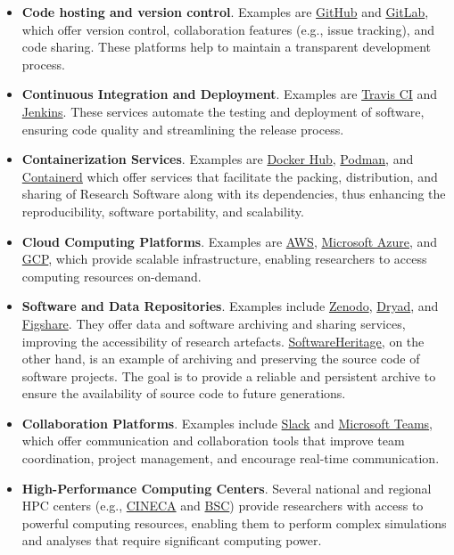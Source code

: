 \begin{itemize}
    \item \textbf{Code hosting and version control}. Examples are \href{https://github.com}{GitHub} and \href{https://about.gitlab.com/}{GitLab}, which offer version control, collaboration features (e.g., issue tracking), and code sharing. These platforms help to maintain a transparent development process.
    \item \textbf{Continuous Integration and Deployment}. Examples are \href{https://www.travis-ci.com/}{Travis CI} and \href{https://jenkins.io}{Jenkins}. These services automate the testing and deployment of software, ensuring code quality and streamlining the release process.
    \item \textbf{Containerization Services}. Examples are \href{https://hub.docker.com/}{Docker Hub}, \href{https://podman.io}{Podman}, and \href{https://containerd.io}{Containerd} which offer services that facilitate the packing, distribution, and sharing of Research Software along with its dependencies, thus enhancing the reproducibility, software portability, and scalability.
    \item \textbf{Cloud Computing Platforms}. Examples are \href{https://aws.amazon.com/}{AWS}, \href{https://azure.microsoft.com/}{Microsoft Azure}, and \href{https://cloud.google.com/}{GCP}, which provide scalable infrastructure, enabling researchers to access computing resources on-demand.
    \item \textbf{Software and Data Repositories}. Examples include \href{https://zenodo.org/}{Zenodo}, \href{https://datadryad.org/}{Dryad}, and \href{https://figshare.com/}{Figshare}. They offer data and software archiving and sharing services, improving the accessibility of research artefacts. \href{https://www.softwareheritage.org/}{SoftwareHeritage}, on the other hand, is an example of archiving and preserving the source code of software projects. The goal is to provide a reliable and persistent archive to ensure the availability of source code to future generations.
    \item \textbf{Collaboration Platforms}. Examples include \href{https://slack.com}{Slack} and \href{https://www.microsoft.com/en-us/microsoft-teams/group-chat-software}{Microsoft Teams}, which offer communication and collaboration tools that improve team coordination, project management, and encourage real-time communication.
    \item \textbf{High-Performance Computing Centers}. Several national and regional HPC centers (e.g., \href{https://www.cineca.it/en}{CINECA} and \href{https://www.bsc.es/}{BSC}) provide researchers with access to powerful computing resources, enabling them to perform complex simulations and analyses that require significant computing power.
\end{itemize}

